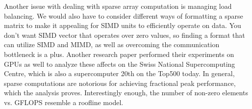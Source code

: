 \documentclass[11pt]{article}
\begin{document}
Another issue with dealing with sparse array computation is managing load balancing. \cite{10.1145/3149704.3149767} We would also have to consider different ways of formatting a sparse matrix to make it appealing for SIMD units to efficiently operate on data. You don't want SIMD vector that operates over zero values, so finding a format that can utilize SIMD and MIMD, as well as overcoming the communication bottleneck is a plus. Another research paper performed their experiments on GPUs as well to analyze these affects on the Swiss National Supercomputing Centre, which is also a supercomputer 20th on the Top500 today. In general, sparse computations are notorious for achieving fractional peak performance, which the analysis proves. Interestingly enough, the number of non-zero elements vs. GFLOPS resemble a roofline model.


 
\end{document}
